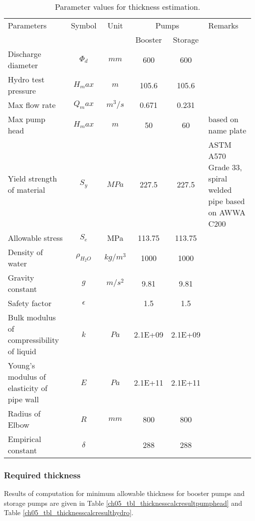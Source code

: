 \begin{table}[h]
	\caption{Parameter values for thickness estimation.}
	\label{ch05_tbl_thicknesscalc}

	{\footnotesize
\begin{tabular}{p{4cm}|c|c|c|c|p{4cm}}
	\hline
	Parameters & Symbol & Unit & \multicolumn{2}{c|}{Pumps} & Remarks \\ 
	&  &  & Booster & Storage &  \\ 
	\hline
Discharge diameter & $\Phi_d$ & $mm$ & 600 & 600 &  \\ 
Hydro test pressure & $H_max$ & $m$ & 105.6 & 105.6 &  \\ 
Max flow rate & $Q_max$ & $m^3/s$ & 0.671 & 0.231 &  \\ 
Max pump head & $H_max$ & $m$ & 50 & 60 & based on name plate \\ 
Yield strength of material & $S_y$ & $MPa$ & 227.5 & 227.5 & ASTM A570 Grade 33, spiral welded pipe based on AWWA C200 \\ 
Allowable stress & $S_e$ & MPa & 113.75 & 113.75 &  \\ 
Density of water & $\rho_{H_2O}$ & $kg/m^3$ & 1000 & 1000 &  \\ 
Gravity constant & $g$ & $m/s^2$ & 9.81 & 9.81 &  \\ 
Safety factor & $\epsilon$ &  & 1.5 & 1.5 &  \\ 
Bulk modulus of compressibility of liquid & $k$ & $Pa$ & 2.1E+09 & 2.1E+09 &  \\ 
Young's modulus of elasticity of pipe wall & $E$ & $Pa$ & 2.1E+11 & 2.1E+11 &  \\ 
Radius of Elbow & $R$ & $mm$ & 800 & 800 &  \\ 
Empirical constant & $\delta$ &  & 288 & 288 &  \\ 
	\hline
\end{tabular}
	}
\end{table}

\subsubsection{Required thickness}

Results of computation for minimum allowable thickness for booster pumps and storage pumps are given in Table \ref{ch05_tbl_thicknesscalcresultpumphead} and Table \ref{ch05_tbl_thicknesscalcresulthydro}.

